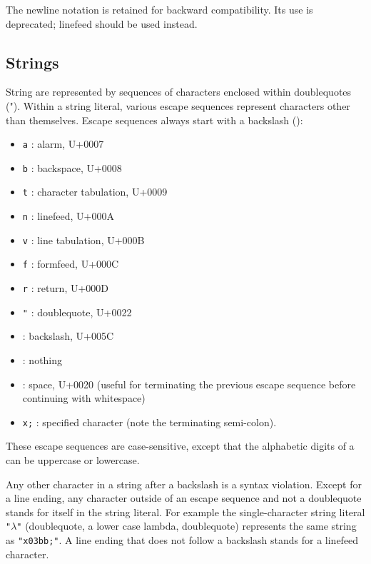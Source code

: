 \begin{note}
  The {\cf\sharpsign\backwhack{}newline} notation is retained for
  backward compatibility.  Its use is deprecated;
  {\cf\sharpsign\backwhack{}linefeed} should be used instead.
\end{note}

\subsection{Strings}

\vest String are represented by sequences of characters enclosed within doublequotes
({\cf "}).  Within a string literal, various escape
sequences represent characters other than
themselves.  Escape sequences always start with a backslash (\backwhack{}):

\begin{itemize}
\item{\tt \backwhack{}a} : alarm, U+0007
\item{\tt \backwhack{}b} : backspace, U+0008 
\item{\tt \backwhack{}t} : character tabulation, U+0009 
\item{\tt \backwhack{}n} : linefeed, U+000A 
\item{\tt \backwhack{}v} : line tabulation, U+000B 
\item{\tt \backwhack{}f} : formfeed, U+000C 
\item{\tt \backwhack{}r} : return, U+000D 
\item{\tt \backwhack{}}\verb|"| : doublequote, U+0022 
\item{\tt \backwhack{}\backwhack{}} : backslash, U+005C 
\item{\tt \backwhack{}} : nothing
\item{\tt \backwhack{}} : space, U+0020 (useful for terminating the
  previous escape sequence before continuing with whitespace)
\item{\tt \backwhack{}x;} : specified character (note the
  terminating semi-colon).
\end{itemize}

These escape sequences are case-sensitive, except that the alphabetic
digits of a  can be uppercase or lowercase.

Any other character in a string after a backslash is a syntax violation. Except
for a line ending, any
character outside of an escape sequence and not a doublequote stands
for itself in the string literal. For example the single-character
string literal {\tt "$\lambda$"} (doublequote, a lower case lambda, doublequote)
represents the same string as {\tt "\backwhack{}x03bb;"}.
A line ending that does not follow a backslash stands for a linefeed character.

